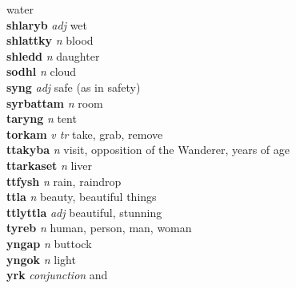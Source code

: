 water\\\textbf{shlaryb}   \emph{adj} \textperiodcentered wet\\\textbf{shlattky}   \emph{n} \textperiodcentered blood\\\textbf{shledd}   \emph{n} \textperiodcentered daughter\\\textbf{sodhl}   \emph{n} \textperiodcentered cloud\\\textbf{syng}   \emph{adj} \textperiodcentered safe (as in safety)\\\textbf{syrbattam}   \emph{n} \textperiodcentered room\\\textbf{taryng}   \emph{n} \textperiodcentered tent\\\textbf{torkam}   \emph{v tr} \textperiodcentered take, grab, remove\\\textbf{ttakyba}   \emph{n} \textperiodcentered visit, opposition of the Wanderer, years of age\\\textbf{ttarkaset}   \emph{n} \textperiodcentered liver\\\textbf{ttfysh}   \emph{n} \textperiodcentered rain, raindrop\\\textbf{ttla}   \emph{n} \textperiodcentered beauty, beautiful things\\\textbf{ttlyttla}   \emph{adj} \textperiodcentered beautiful, stunning\\\textbf{tyreb}   \emph{n} \textperiodcentered human, person, man, woman\\\textbf{yngap}   \emph{n} \textperiodcentered buttock\\\textbf{yngok}   \emph{n} \textperiodcentered light\\\textbf{yrk}   \emph{conjunction} \textperiodcentered and\\